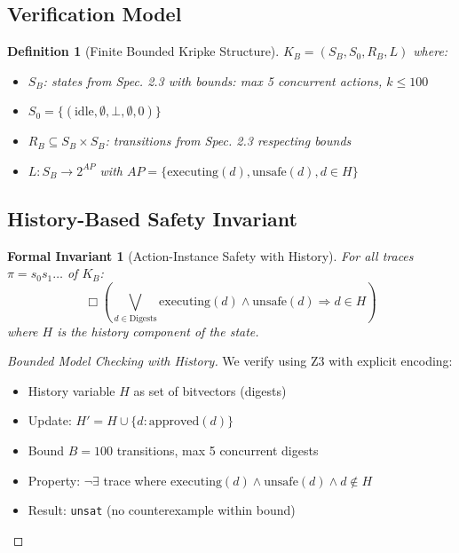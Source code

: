 \documentclass[12pt]{article}
\newtheorem{definition}{Definition}[section]
\newtheorem{invariant}{Formal Invariant}[section]
\begin{document}
\subsection{Verification Model}

\begin{definition}[Finite Bounded Kripke Structure]
$K_B = (S_B, S_0, R_B, L)$ where:
\begin{itemize}
    \item $S_B$: states from Spec. 2.3 with bounds: max 5 concurrent actions, $k \leq 100$
    \item $S_0 = \{(\text{idle}, \emptyset, \bot, \emptyset, 0)\}$
    \item $R_B \subseteq S_B \times S_B$: transitions from Spec. 2.3 respecting bounds
    \item $L: S_B \to 2^{AP}$ with $AP = \{\text{executing}(d), \text{unsafe}(d), d \in H\}$
\end{itemize}
\end{definition}

\subsection{History-Based Safety Invariant}

\begin{invariant}[Action-Instance Safety with History]
For all traces $\pi = s_0 s_1 \dots$ of $K_B$:
\[
\Box\left(\bigvee_{d \in \text{Digests}} \text{executing}(d) \land \text{unsafe}(d) \Rightarrow d \in H\right)
\]
where $H$ is the history component of the state.
\end{invariant}

\begin{proof}[Bounded Model Checking with History]
We verify using Z3 with explicit encoding:
\begin{itemize}
    \item History variable $H$ as set of bitvectors (digests)
    \item Update: $H' = H \cup \{d : \text{approved}(d)\}$
    \item Bound $B=100$ transitions, max 5 concurrent digests
    \item Property: $\neg\exists$ trace where $\text{executing}(d) \land \text{unsafe}(d) \land d \notin H$
    \item Result: \texttt{unsat} (no counterexample within bound)
\end{itemize}
\end{proof}
\end{document}
